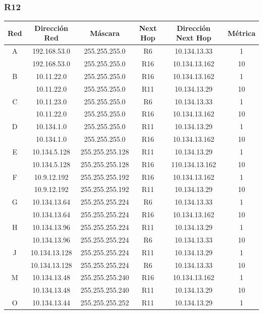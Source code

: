 \documentclass[12pt, a4paper, spanish]{article}
\begin{document}
\subsubsection{R12}
\begin{center}
\begin{tabular}{|c|c|c|c|c|c|}
	\hline
	Red & Dirección Red & Máscara & Next Hop & Dirección Next Hop & Métrica \\
	\hline
	\hline
	A & 192.168.53.0 & 255.255.255.0 & R6 & 10.134.13.33 & 1\\
	 & 192.168.53.0 & 255.255.255.0 & R16 & 10.134.13.162 & 10\\
	\hline
	B & 10.11.22.0 & 255.255.255.0 & R16 & 10.134.13.162 & 1\\
	 & 10.11.22.0 & 255.255.255.0 & R11 & 10.134.13.29 & 10\\
	\hline
	C & 10.11.23.0 & 255.255.255.0 & R6 & 10.134.13.33 & 1\\
	 & 10.11.22.0 & 255.255.255.0 & R16 & 10.134.13.162 & 10\\
	\hline
	D & 10.134.1.0 & 255.255.255.0 & R11 & 10.134.13.29 & 1\\
	 & 10.134.1.0 & 255.255.255.0 & R16 & 10.134.13.162 & 10\\
	\hline
	E & 10.134.5.128 & 255.255.255.128 & R11 & 10.134.13.29 & 1\\
	 & 10.134.5.128 & 255.255.255.128 & R16 & 110.134.13.162 & 10\\
	\hline
	F & 10.9.12.192 & 255.255.255.192 & R16 & 10.134.13.162 & 1\\
	 & 10.9.12.192 & 255.255.255.192 & R11 & 10.134.13.29 & 10\\
	\hline
	G & 10.134.13.64 & 255.255.255.224 & R6 & 10.134.13.33 & 1\\
	 & 10.134.13.64 & 255.255.255.224 & R16 & 10.134.13.162 & 10\\
	\hline
	H & 10.134.13.96 & 255.255.255.224 & R11 & 10.134.13.29 & 1\\
	 & 10.134.13.96 & 255.255.255.224 & R6 & 10.134.13.33 & 10\\
	\hline
	J & 10.134.13.128 & 255.255.255.224 & R11 & 10.134.13.29 & 1\\
	 & 10.134.13.128 & 255.255.255.224 & R6 & 10.134.13.33 & 10\\
	\hline
	M & 10.134.13.48 & 255.255.255.240 & R16 & 10.134.13.162 & 1\\
	 & 10.134.13.48 & 255.255.255.240 & R11 & 10.134.13.29 & 10\\
	\hline
	O & 10.134.13.44 & 255.255.255.252 & R11 & 10.134.13.29 & 1\\

\end{tabular}
\end{center}
\end{document}
